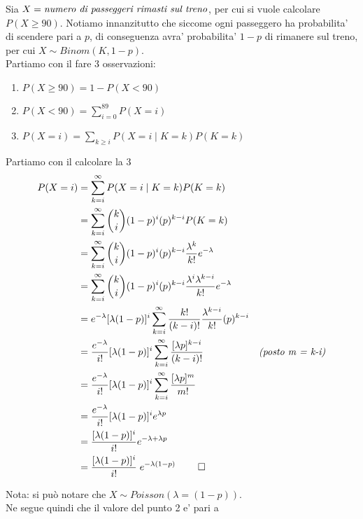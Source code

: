 \documentclass{homework}
\begin{document}
\exercise*[2.a]
Sia $X = \emph{numero di passeggeri rimasti sul treno}$, per cui si vuole calcolare $P(X \geq 90)$. Notiamo innanzitutto che siccome ogni passeggero ha probabilita' di scendere pari a $p$, di conseguenza avra' probabilita' $1-p$ di rimanere 
sul treno, per cui $X \sim Binom(K, 1-p)$. \\
Partiamo con il fare 3 osservazioni:
\begin{enumerate} 
    \item $P(X \geq 90) = 1 - P(X < 90)$
    \item $P(X < 90) = \sum^{89}_{i=0} P(X = i)$
    \item $P(X = i) = \sum_{k \ge i} P(X = i \mid K =k)P(K=k)$
\end{enumerate}
Partiamo con il calcolare la 3
\begin{equation} \label{eq:4}
    \begin{align}
        P(X = i) &= \sum_{k = i}^{\infty} P(X = i \mid K = k)P(K = k)\\
                 &= \sum_{k = i}^{\infty} \binom{k}{i} (1-p)^i(p)^{k-i}P(K=k)\\
                 &= \sum_{k = i}^{\infty} \binom{k}{i} (1-p)^i(p)^{k-i}\frac{\lambda^k}{k!} e^{-\lambda}\\
                 &= \sum_{k = i}^{\infty} \binom{k}{i} (1-p)^i(p)^{k-i}\frac{\lambda^i\lambda^{k-i}}{k!}e^{-\lambda}\\
                 &= e^{-\lambda}[\lambda (1-p)]^i \sum_{k = i}^{\infty} \frac{k!}{(k-i)!}\frac{\lambda^{k-i}}{k!}(p)^{k-i}\\
                 &= \frac{e^{-\lambda}}{i!}[\lambda (1-p)]^i \sum_{k = i}^{\infty} \frac{[\lambda p]^{k-i}}{(k-i)!} & \emph{(posto m = k-i)} \\
                 &= \frac{e^{-\lambda}}{i!}[\lambda (1-p)]^i \sum_{k = i}^{\infty} \frac{[\lambda p]^{m}}{m!} \\
                 &= \frac{e^{-\lambda}}{i!}[\lambda (1-p)]^ie^{\lambda p} \\
                 &= \frac{[\lambda (1-p)]^i}{i!} e^{-\lambda + \lambda p} \\
                 &= \frac{[\lambda(1 - p)]^i}{i!} \; e^{-\lambda(1-p)} \; \qed
    \end{align}
\end{equation}

Nota: si può notare che $X \sim Poisson(\lambda = (1-p))$. \\
Ne segue quindi che il valore del punto 2 e' pari a
 
\end{document}
